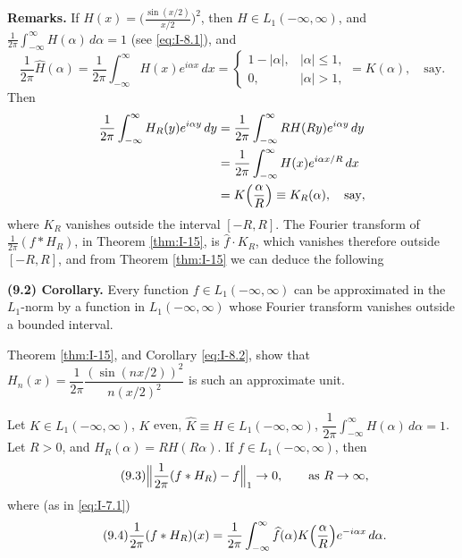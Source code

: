 \noindent\textbf{Remarks.}
If $H(x)=\bigl(\frac{\sin(x/2)}{x/2}\bigr)^2$, then $H\in L_1(-\infty,\infty)$, and $\frac{1}{2\pi}\int_{-\infty}^{\infty}H(\alpha)\,d\alpha=1$ (see \eqref{eq:I-8.1}), and
\begin{equation*}
\frac{1}{2\pi}\widehat H(\alpha)
=\frac{1}{2\pi}\int_{-\infty}^{\infty}H(x)e^{i\alpha x}\,dx
=
\begin{cases}
1-|\alpha|,&|\alpha|\le 1,\\
0,&|\alpha|>1,
\end{cases}
=K(\alpha),\quad\text{say}.
\end{equation*}
Then
\begin{equation*}
\begin{aligned}
\frac{1}{2\pi}\int_{-\infty}^{\infty}H_R(y)e^{i\alpha y}\,dy &= \frac{1}{2\pi}\int_{-\infty}^{\infty}RH(Ry)e^{i\alpha y}\,dy\\
&= \frac{1}{2\pi}\int_{-\infty}^{\infty}H(x)e^{i\alpha x/R}\,dx\\
&= K\Bigl(\frac{\alpha}{R}\Bigr)\equiv K_R(\alpha),\quad\text{say},
\end{aligned}
\end{equation*}
where $K_R$ vanishes outside the interval $[-R,R]$. The Fourier transform of $\frac{1}{2\pi}(f*H_R)$, in Theorem \ref{thm:I-15}, is $\widehat f\cdot K_R$, which vanishes therefore outside $[-R,R]$, and from Theorem \ref{thm:I-15} we can deduce the following

\noindent\textbf{(9.2) Corollary.}
Every function $f\in L_1(-\infty,\infty)$ can be approximated in the $L_1$-norm by a function in $L_1(-\infty,\infty)$ whose Fourier transform vanishes outside a bounded interval.

Theorem \ref{thm:I-15}, and Corollary \eqref{eq:I-8.2}, show that $H_n(x)=\dfrac{1}{2\pi}\dfrac{(\sin(nx/2))^2}{n(x/2)^2}$ is such an approximate unit.

\begin{theorem}\label{thm:I-16}
Let $K\in L_1(-\infty,\infty)$, $K$ even, $\hat K\equiv H\in L_1(-\infty,\infty)$, $\dfrac{1}{2\pi}\int_{-\infty}^{\infty}H(\alpha)\,d\alpha=1$. Let $R>0$, and $H_R(\alpha)=RH(R\alpha)$. If $f\in L_1(-\infty,\infty)$, then
\begin{equation}\label{eq:I-9.3}\tag{9.3}
\Bigl\|\frac{1}{2\pi}(f*H_R)-f\Bigr\|_1\to 0,\qquad\text{as }R\to\infty,
\end{equation}
where (as in \eqref{eq:I-7.1})
\begin{equation}\label{eq:I-9.4}\tag{9.4}
\frac{1}{2\pi}(f*H_R)(x)=\frac{1}{2\pi}\int_{-\infty}^{\infty}\widehat f(\alpha)K\Bigl(\frac{\alpha}{R}\Bigr)e^{-i\alpha x}\,d\alpha.
\end{equation}
\end{theorem}

